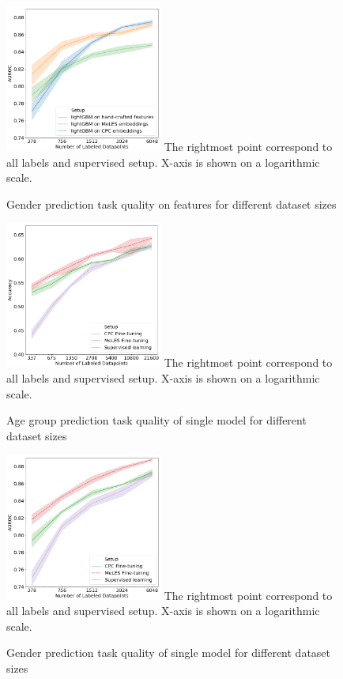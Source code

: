 \documentclass[sigconf, anonymous]{acmart}
\begin{document}
\begin{figure}[h]
  \caption{Gender prediction task quality on features for different dataset sizes}
  \includegraphics[width=0.46\textwidth]{figures/ss_gen_0.png}
  \small{The rightmost point correspond to all labels and supervised setup. X-axis is shown on a logarithmic scale.}
  \label{fig-semi-gender-0}
\end{figure}

\begin{figure}[h]
  \caption{Age group prediction task quality of single model for different dataset sizes}
  \includegraphics[width=0.46\textwidth]{figures/ss_age_1_wopl.png}
  \small{The rightmost point correspond to all labels and supervised setup. X-axis is shown on a logarithmic scale.}
  \label{fig-semi-age-1}
\end{figure}

\begin{figure}[h]
  \caption{Gender prediction task quality of single model for different dataset sizes}
  \includegraphics[width=0.46\textwidth]{figures/ss_gen_1.png}
  \small{The rightmost point correspond to all labels and supervised setup. X-axis is shown on a logarithmic scale.}
  \label{fig-semi-gender-1}
\end{figure}
\end{document}

